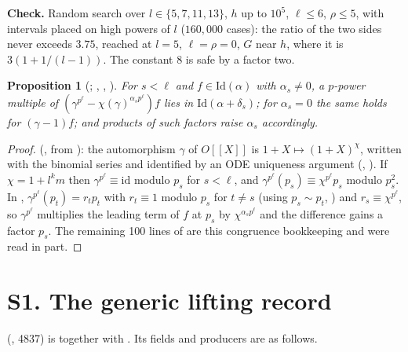 \documentclass[11pt]{article}
\newtheorem{prop}[lemma]{Proposition}
\theoremstyle{definition}
\theoremstyle{remark}
\begin{document}
\noindent\textbf{Check.} Random search over $l\in\{5,7,11,13\}$, $h$ up to $10^5$, $\ell\le6$, $\rho\le5$, with intervals placed on high powers of $l$ ($160{,}000$ cases): the ratio of the two sides never exceeds $3.75$, reached at $l=5$, $\ell=\rho=0$, $G$ near $h$, where it is $3(1+1/(l-1))$. The constant $8$ is safe by a factor two.

\begin{prop}[; , , ]
For $s<\ell$ and $f\in\mathrm{Id}(\alpha)$ with $\alpha_s\ne0$, a $p$-power multiple of $(\gamma^{p^\ell}-\chi(\gamma)^{\alpha_sp^\ell})f$ lies in $\mathrm{Id}(\alpha+\delta_s)$; for $\alpha_s=0$ the same holds for $(\gamma-1)f$; and products of such factors raise $\alpha_s$ accordingly.
\end{prop}
\begin{proof}
 (, from ): the automorphism $\gamma$ of $O[[X]]$ is $1+X\mapsto(1+X)^{\chi}$, written with the binomial series and identified by an ODE uniqueness argument (, ). If $\chi=1+l^km$ then $\gamma^{p^\ell}\equiv\mathrm{id}$ modulo $p_s$ for $s<\ell$, and $\gamma^{p^\ell}(p_s)\equiv\chi^{p^\ell}p_s$ modulo $p_s^2$. In , $\gamma^{p^\ell}(p_t)=r_tp_t$ with $r_t\equiv1$ modulo $p_s$ for $t\ne s$ (using $p_s\sim p_t$, ) and $r_s\equiv\chi^{p^\ell}$, so $\gamma^{p^\ell}$ multiplies the leading term of $f$ at $p_s$ by $\chi^{\alpha_sp^\ell}$ and the difference gains a factor $p_s$. The remaining 100 lines of  are this congruence bookkeeping and were read in part.
\end{proof}

\section{S1. The generic lifting record}\label{sec:s1}

 (, 4837) is  together with . Its fields and producers are as follows.
\end{document}
